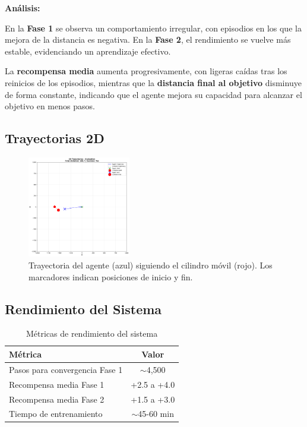 \documentclass[12pt,a4paper]{article}
\begin{document}
\textbf{Análisis:}

En la \textbf{Fase 1} se observa un comportamiento irregular, con episodios en los que la mejora de la distancia es negativa. En la \textbf{Fase 2}, el rendimiento se vuelve más estable, evidenciando un aprendizaje efectivo.

La \textbf{recompensa media} aumenta progresivamente, con ligeras caídas tras los reinicios de los episodios, mientras que la \textbf{distancia final al objetivo} disminuye de forma constante, indicando que el agente mejora su capacidad para alcanzar el objetivo en menos pasos.


\subsection{Trayectorias 2D}

\begin{figure}[H]
    \centering
    \includegraphics[width=0.4\textwidth]{logs/evaluation_trajectory.png}
    \caption{Trayectoria del agente (azul) siguiendo el cilindro móvil (rojo). Los marcadores indican posiciones de inicio y fin.}
    \label{fig:trajectories}
\end{figure}


\subsection{Rendimiento del Sistema}

\begin{table}[H]
\centering
\begin{tabular}{@{}lc@{}}
\toprule
\textbf{Métrica} & \textbf{Valor} \\ \midrule
Pasos para convergencia Fase 1 & $\sim$4,500 \\
Recompensa media Fase 1 & +2.5 a +4.0 \\
Recompensa media Fase 2 & +1.5 a +3.0 \\
Tiempo de entrenamiento & $\sim$45-60 min \\ \bottomrule
\end{tabular}
\caption{Métricas de rendimiento del sistema}
\end{table}
\end{document}
